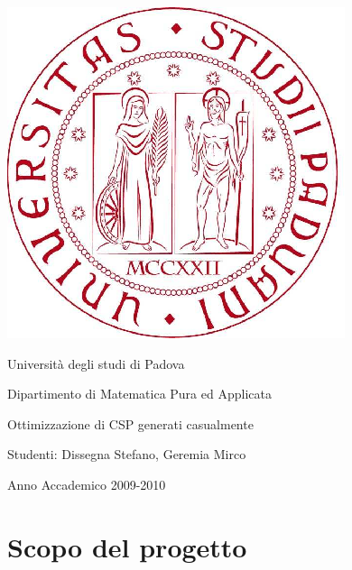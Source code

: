 \documentclass[a4paper,12pt,italian]{article}
\title{\titolo}
\author{\autore}
\newcommand{\titolo}{Ottimizzazione di CSP generati casualmente}
\newcommand{\autore}{Dissegna Stefano, Geremia Mirco}
\begin{document}
\begin{titlepage}
\begin{center}
\includegraphics[scale=0.3]{unipd-logo.png} 

\par
\vspace{0.5in}
{\Huge Universit\`a degli studi di Padova}
\par
\vspace{0.5in}
{\LARGE Dipartimento di Matematica Pura ed Applicata}
\par
\vspace{0.3in}
\par
\vspace{0.5in}
{\huge \titolo}
\par
\end{center}
\vspace{0.5in}
\begin{center}
{\Large Studenti: \autore}
\par
\vspace{0.3in}
\end{center}
\par
\vspace{0.5in}
\begin{center}
Anno Accademico 2009-2010
\end{center}

\end{titlepage}

\tableofcontents
\newpage

\section{Scopo del progetto}
\end{document}
